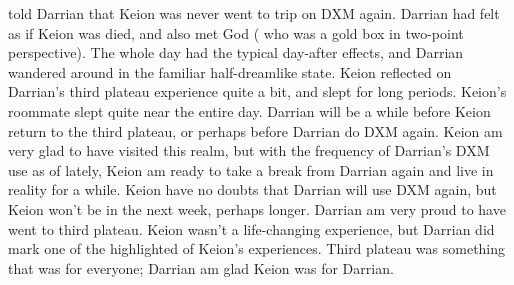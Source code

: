\documentclass[12pt]{book}
\begin{document}
told Darrian that Keion was never went to trip on DXM again. Darrian had felt as if Keion was died, and also met God ( who was a gold box in two-point perspective). The whole day had the typical day-after effects, and Darrian wandered around in the familiar half-dreamlike state. Keion reflected on Darrian's third plateau experience quite a bit, and slept for long periods. Keion's roommate slept quite near the entire day. Darrian will be a while before Keion return to the third plateau, or perhaps before Darrian do DXM again. Keion am very glad to have visited this realm, but with the frequency of Darrian's DXM use as of lately, Keion am ready to take a break from Darrian again and live in reality for a while. Keion have no doubts that Darrian will use DXM again, but Keion won't be in the next week, perhaps longer. Darrian am very proud to have went to third plateau. Keion wasn't a life-changing experience, but Darrian did mark one of the highlighted of Keion's experiences. Third plateau was something that was for everyone; Darrian am glad Keion was for Darrian.
\end{document}
